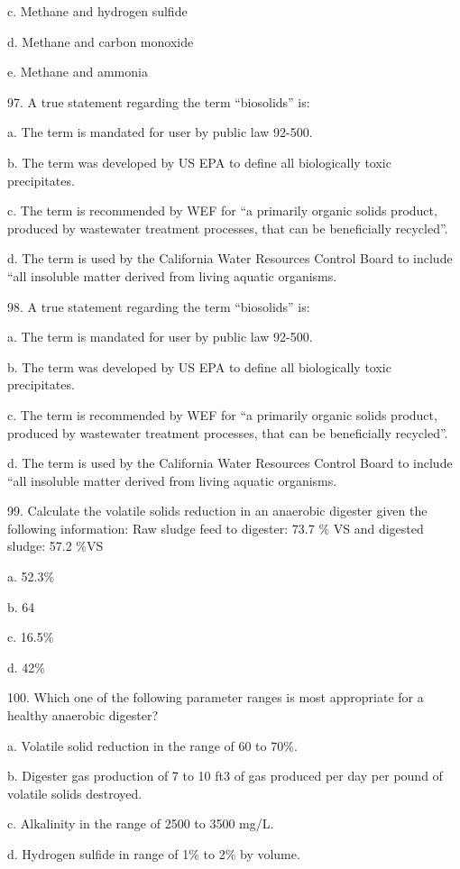 \documentclass{article}
\begin{document}
c. Methane and hydrogen sulfide 

d. Methane and carbon monoxide 

e. Methane and ammonia 


97. A true statement regarding the term “biosolids” is: 

a. The term is mandated for user by public law 92-500. 

b. The term was developed by US EPA to define all biologically toxic precipitates. 

c. The term is recommended by WEF for “a primarily organic solids product, produced by wastewater treatment processes, that can be beneficially recycled”. 

d. The term is used by the California Water Resources Control Board to include “all insoluble matter derived from living aquatic organisms. 


98. A true statement regarding the term “biosolids” is: 

a. The term is mandated for user by public law 92-500. 

b. The term was developed by US EPA to define all biologically toxic precipitates. 

c. The term is recommended by WEF for “a primarily organic solids product, produced by wastewater treatment processes, that can be beneficially recycled”. 

d. The term is used by the California Water Resources Control Board to include “all insoluble matter derived from living aquatic organisms. 


99. Calculate the volatile solids reduction in an anaerobic digester given the following information: Raw sludge feed to digester: 73.7 \% VS and digested sludge: 57.2 \%VS 

a. 52.3\% 

b. 64 

c. 16.5\% 

d. 42\% 


100. Which one of the following parameter ranges is most appropriate for a healthy anaerobic digester? 

a. Volatile solid reduction in the range of 60 to 70\%. 

b. Digester gas production of 7 to 10 ft3 of gas produced per day per pound of volatile solids destroyed. 

c. Alkalinity in the range of 2500 to 3500 mg/L. 

d. Hydrogen sulfide in range of 1\% to 2\% by volume. 
\end{document}
